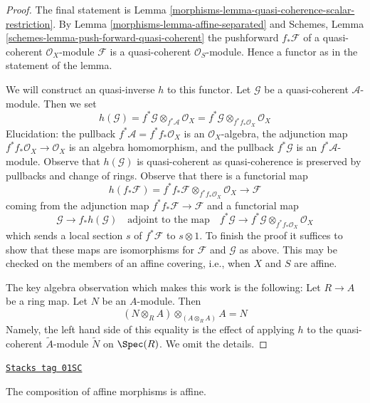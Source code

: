 \begin{proof}

The final statement is Lemma \ref{morphisms-lemma-quasi-coherence-scalar-restriction}.
By Lemma \ref{morphisms-lemma-affine-separated} and
Schemes, Lemma \ref{schemes-lemma-push-forward-quasi-coherent}
the pushforward $f_*\mathcal{F}$ of a quasi-coherent $\mathcal{O}_X$-module
$\mathcal{F}$
is a quasi-coherent $\mathcal{O}_S$-module. Hence a functor as in
the statement of the lemma.

\medskip\noindent
We will construct an quasi-inverse $h$ to this functor. Let $\mathcal{G}$
be a quasi-coherent $\mathcal{A}$-module. Then we set
$$
h(\mathcal{G}) = f^*\mathcal{G} \otimes_{f^*\mathcal{A}} \mathcal{O}_X =
f^*\mathcal{G} \otimes_{f^*f_*\mathcal{O}_X} \mathcal{O}_X
$$
Elucidation: the pullback $f^*\mathcal{A} = f^*f_*\mathcal{O}_X$
is an $\mathcal{O}_X$-algebra, the adjunction map
$f^*f_*\mathcal{O}_X \to \mathcal{O}_X$ is an algebra homomorphism, and
the pullback $f^*\mathcal{G}$ is an $f^*\mathcal{A}$-module. Observe that
$h(\mathcal{G})$ is quasi-coherent as quasi-coherence is preserved by
pullbacks and change of rings. Observe that there is a functorial map
$$
h(f_*\mathcal{F}) =
f^*f_*\mathcal{F} \otimes_{f^*f_*\mathcal{O}_X} \mathcal{O}_X \to \mathcal{F}
$$
coming from the adjunction map $f^*f_*\mathcal{F} \to \mathcal{F}$ and
a functorial map
$$
\mathcal{G} \to f_*h(\mathcal{G}) \quad\text{adjoint to the map}\quad
f^*\mathcal{G} \to f^*\mathcal{G} \otimes_{f^*f_*\mathcal{O}_X} \mathcal{O}_X
$$
which sends a local section $s$ of $f^*\mathcal{F}$ to $s \otimes 1$.
To finish the proof it suffices to show that these maps are isomorphisms
for $\mathcal{F}$ and $\mathcal{G}$ as above. This may be checked on the
members of an affine covering, i.e., when $X$ and $S$ are affine.

\medskip\noindent
The key algebra observation which makes this work is the
following: Let $R \to A$ be a ring map. Let $N$ be an $A$-module. Then
$$
(N \otimes_R A) \otimes_{(A \otimes_R A)} A = N
$$
Namely, the left hand side of this equality is the effect of applying
$h$ to the quasi-coherent $\widetilde{A}$-module $\widetilde{N}$ on $\Spec(R)$.
We omit the details.
\end{proof}

\begin{lemma}
\label{morphisms-lemma-composition-affine}
\href{https://stacks.math.columbia.edu/tag/01SC}{\texttt{Stacks tag 01SC}}

The composition of affine morphisms is affine.
\end{lemma}

